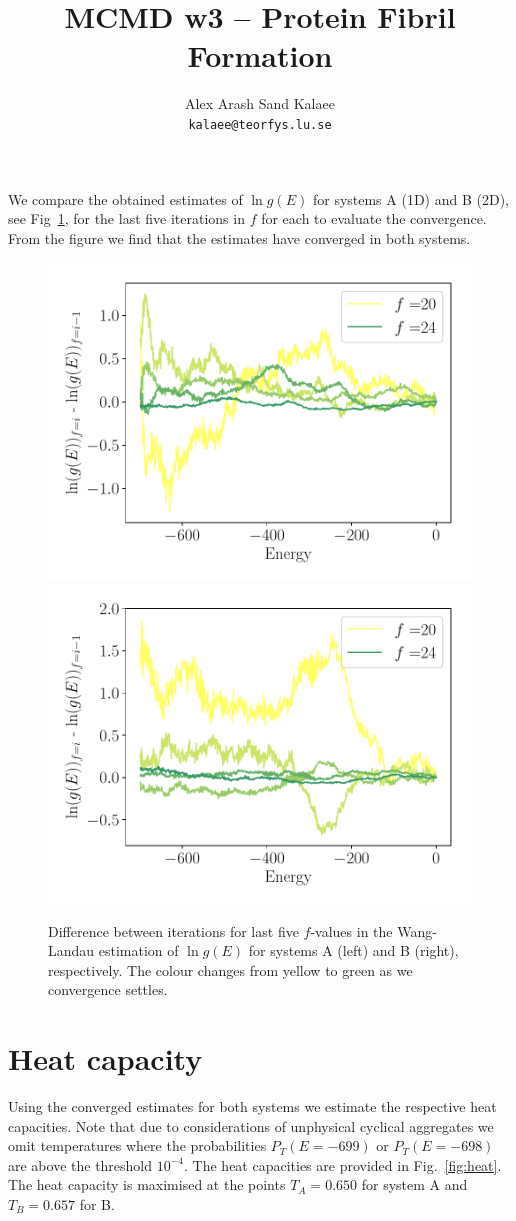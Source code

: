 \documentclass{article}
\begin{document}
\title{MCMD w3 -- Protein Fibril Formation}
\author{Alex Arash Sand Kalaee\\ \texttt{kalaee@teorfys.lu.se}}
\maketitle
We compare the obtained estimates of $\ln g(E)$ for systems A (1D) and B (2D),
see Fig~\ref{fig:compar}, for the last five iterations in $f$ for each to
evaluate the convergence. From the figure we find that the estimates
have converged in both systems.

\begin{figure}
\centering
\includegraphics[width=0.49\linewidth]{projA_0.pdf}
\includegraphics[width=0.49\linewidth]{projB_0.pdf}
\caption{ Difference between iterations for last five $f$-values in the
Wang-Landau estimation of $\ln g(E)$ for systems A (left) and B (right),
respectively. The colour changes from yellow to green as we convergence settles.}
\label{fig:compar}
\end{figure}

\section{Heat capacity}
Using the converged estimates for both systems we estimate the respective
heat capacities. Note that due to considerations of unphysical cyclical
aggregates we omit temperatures where the probabilities $P_T(E=-699)$ or
$P_T(E=-698)$ are above the threshold $10^{-4}$. The heat capacities
are provided in Fig.~\ref{fig:heat}. The heat capacity is maximised at the
points $T_A = 0.650$ for system A and $T_B= 0.657$ for B.
\end{document}
